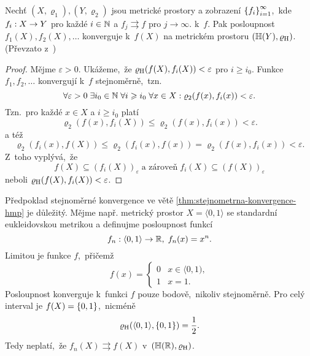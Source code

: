\begin{theorem}\label{thm:stejnometrna-konvergence-hmp}
    Nechť $(X,\varrho_1),(Y,\varrho_2)$ jsou metrické prostory a zobrazení $\left\{f_i\right\}_{i=1}^\infty$,~kde $f_i:X \rightarrow Y$ pro každé $i\in\mathbb{N}$ a $f_j\rightrightarrows f$ pro $j\to\infty$. k~$f$. Pak posloupnost $f_1(X),f_2(X),\ldots$ konverguje k~$f(X)$ na metrickém prostoru $(\mathbb{H}(Y),\varrho_\textup{H})$. (Převzato z~\citep[str. 74]{Edgar2008})
\end{theorem}
\begin{proof}
    Mějme $\varepsilon>0$. Ukážeme,~že $\varrho_\textup{H}(f(X),f_i(X))<\varepsilon$ pro $i\geqslant i_0$. Funkce $f_1,f_2,\ldots$ konvergují k~$f$ stejnoměrně,~tzn.
    \[\forall\varepsilon>0\;\exists i_0\in\mathbb{N}\;\forall i\geqslant i_0\;\forall x\in X:\varrho_2(f(x),f_i(x))<\varepsilon.\]
    Tzn.~pro každé $x\in X$ a $i\geqslant i_0$ platí
    \[\varrho_2(f(x),f_i(X))\leqslant\varrho_2(f(x),f_i(x))<\varepsilon.\]
    a též
    \[\varrho_2(f_i(x),f(X))\leqslant\varrho_2(f_i(x),f(x))=\varrho_2(f(x),f_i(x))<\varepsilon.\]
    Z~toho vyplývá,~že
    \[f(X)\subseteq (f_i(X))_\varepsilon\;\text{a zároveň}\;f_i(X)\subseteq (f(X))_\varepsilon\]
    neboli $\varrho_\textup{H}(f(X),f_i(X))<\varepsilon$.
\end{proof}
\begin{remark}
    Předpoklad stejnoměrné konvergence ve větě \ref{thm:stejnometrna-konvergence-hmp} je důležitý. Mějme např. metrický prostor $X=\langle0,1\rangle$ se standardní eukleidovskou metrikou a definujme posloupnost funkcí
    \[f_n:\langle0,1\rangle \rightarrow \mathbb{R},\;f_n(x)=x^n.\]
    Limitou je funkce $f$,~přičemž
    \[f(x) = \begin{cases}
        0 & x \in \langle0,1),\\
        1 & x = 1.
        \end{cases}\]
    Posloupnost konverguje k~funkci $f$ pouze bodově,~nikoliv stejnoměrně. Pro celý interval je $f(X)=\left\{0,1\right\}$,~nicméně
    \[\varrho_\textup{H}(\langle0,1\rangle,\left\{0,1\right\})=\dfrac{1}{2}.\]
    Tedy neplatí,~že $f_n(X)\rightrightarrows f(X)$ v~$(\mathbb{H}(\mathbb{R}),\varrho_\textup{H})$.
\end{remark}